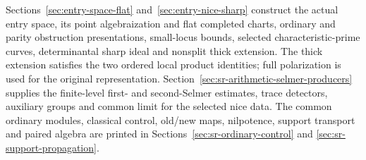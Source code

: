 Sections~\ref{sec:entry-space-flat} and~\ref{sec:entry-nice-sharp}
construct the actual entry space, its point algebraization and flat
completed charts, ordinary and parity obstruction presentations,
small-locus bounds, selected characteristic-prime curves,
determinantal sharp ideal and nonsplit thick extension.
The thick extension satisfies the two ordered local product
identities; full polarization is used for the original representation.
Section~\ref{sec:sr-arithmetic-selmer-producers} supplies the
finite-level first- and second-Selmer estimates, trace detectors,
auxiliary groups and common limit for the selected nice data.
The common ordinary modules, classical control, old/new maps,
nilpotence, support transport and paired algebra are printed in
Sections~\ref{sec:sr-ordinary-control} and
\ref{sec:sr-support-propagation}.

